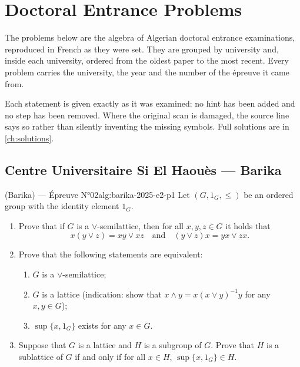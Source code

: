 \chapter{Doctoral Entrance Problems}
\label{ch:problems}

The problems below are the algebra of Algerian doctoral entrance examinations,
reproduced in French as they were set. They are grouped by university and, inside
each university, ordered from the oldest paper to the most recent. Every problem
carries the university, the year and the number of the épreuve it came from.

Each statement is given exactly as it was examined: no hint has been added and no
step has been removed. Where the original scan is damaged, the source line says
so rather than silently inventing the missing symbols. Full solutions are in
\cref{ch:solutions}.
\newpage

\section{Centre Universitaire Si El Haouès --- Barika}

\begin{problem}{(Barika) — Épreuve N°02}{alg:barika-2025-e2-p1}
Let $(G, 1_G, \leq)$ be an ordered group with the identity element $1_G$.
\begin{enumerate}
\item Prove that if $G$ is a $\vee$-semilattice, then for all $x, y, z \in G$ it
      holds that
      $$
      x(y \vee z) = xy \vee xz \quad \text{and} \quad (y \vee z)x = yx \vee zx.
      $$
\item Prove that the following statements are equivalent:
      \begin{enumerate}
      \item $G$ is a $\vee$-semilattice;
      \item $G$ is a lattice (indication: show that $x \wedge y = x(x \vee y)^{-1}y$
            for any $x, y \in G$);
      \item $\sup\{x, 1_G\}$ exists for any $x \in G$.
      \end{enumerate}
\item Suppose that $G$ is a lattice and $H$ is a subgroup of $G$. Prove that $H$ is
      a sublattice of $G$ if and only if for all $x \in H$, $\sup\{x, 1_G\} \in H$.
\end{enumerate}

\end{problem}

